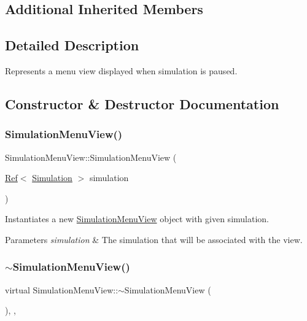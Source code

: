 \subsection*{Additional Inherited Members}


\subsection{Detailed Description}
Represents a menu view displayed when simulation is paused. 



\subsection{Constructor \& Destructor Documentation}
\mbox{\label{class_simulation_menu_view_a88384f9c473c357cd07240715708833f}} 
\subsubsection{\texorpdfstring{SimulationMenuView()}{SimulationMenuView()}}
{\footnotesize\ttfamily Simulation\+Menu\+View\+::\+Simulation\+Menu\+View (\begin{DoxyParamCaption}\item[{\mbox{\hyperlink{class_ref}{Ref}}$<$ \mbox{\hyperlink{class_simulation}{Simulation}} $>$}]{simulation }\end{DoxyParamCaption})}



Instantiates a new \mbox{\hyperlink{class_simulation_menu_view}{Simulation\+Menu\+View}} object with given simulation. 


\begin{DoxyParams}{Parameters}
{\em simulation} & The simulation that will be associated with the view.\\
\hline
\end{DoxyParams}
\mbox{\label{class_simulation_menu_view_adaea5ac31f43ed2cc652b1306f280990}} 
\subsubsection{\texorpdfstring{$\sim$SimulationMenuView()}{~SimulationMenuView()}}
{\footnotesize\ttfamily virtual Simulation\+Menu\+View\+::$\sim$\+Simulation\+Menu\+View (\begin{DoxyParamCaption}{ }\end{DoxyParamCaption})\hspace{0.3cm}{\ttfamily [inline]}, {\ttfamily [override]}, {\ttfamily [virtual]}}



